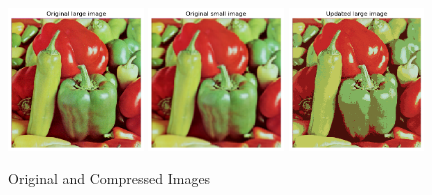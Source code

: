 \begin{answer}

\begin{figure}[H]
    \centering
    \includegraphics[width=0.32\textwidth]{../src/k_means/orig_large.png}
    \includegraphics[width=0.32\textwidth]{../src/k_means/orig_small.png}
    \includegraphics[width=0.32\textwidth]{../src/k_means/updated_large.png}
    \caption{Original and Compressed Images}
\end{figure}

\end{answer}
